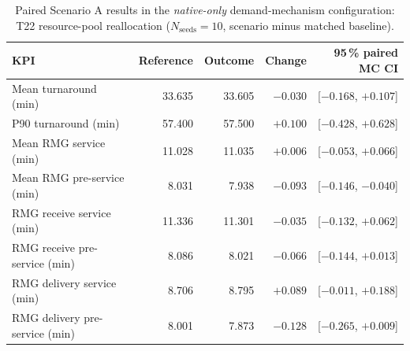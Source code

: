 \begin{table}[htbp]
\centering
\footnotesize
\setlength{\tabcolsep}{3.2pt}
\begin{tabularx}{\textwidth}{@{}Xrrrr@{}}
\toprule
\textbf{KPI} & \textbf{Reference} & \textbf{Outcome} & \textbf{Change} & \textbf{95\,\% paired MC CI} \\
\midrule
Mean turnaround (min) & 33.635 & 33.605 & $-0.030$ & [$-0.168$, $+0.107$] \\
P90 turnaround (min) & 57.400 & 57.500 & $+0.100$ & [$-0.428$, $+0.628$] \\
Mean RMG service (min) & 11.028 & 11.035 & $+0.006$ & [$-0.053$, $+0.066$] \\
Mean RMG pre-service (min) & 8.031 & 7.938 & $-0.093$ & [$-0.146$, $-0.040$] \\
RMG receive service (min) & 11.336 & 11.301 & $-0.035$ & [$-0.132$, $+0.062$] \\
RMG receive pre-service (min) & 8.086 & 8.021 & $-0.066$ & [$-0.144$, $+0.013$] \\
RMG delivery service (min) & 8.706 & 8.795 & $+0.089$ & [$-0.011$, $+0.188$] \\
RMG delivery pre-service (min) & 8.001 & 7.873 & $-0.128$ & [$-0.265$, $+0.009$] \\
\bottomrule
\end{tabularx}
\caption{Paired Scenario A results in the \textit{native-only} demand-mechanism
configuration:
T22 resource-pool reallocation
($N_{\text{seeds}}=10$, scenario minus matched baseline).}
\label{tab:scenario_kpis}
\end{table}

